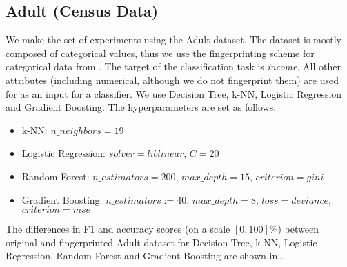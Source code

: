 \subsection{Adult (Census Data)}
We make the set of experiments using the Adult dataset. The dataset is mostly composed of categorical values, thus we use the fingerprinting scheme for categorical data from .
The target of the classification task is \textit{income}.
All other attributes (including numerical, although we do not fingerprint them) are used for as an input for a classifier.
We use Decision Tree, k-NN, Logistic Regression and Gradient Boosting. The hyperparameters are set as follows:
    \begin{itemize}
        \item k-NN: $n\_neighbors=19$
        \item Logistic Regression: $solver=liblinear$, $C=20$
        \item Random Forest: $n\_estimators=200$, $max\_depth=15$, $criterion=gini$
        \item Gradient Boosting: $n\_estimators:=40$, $max\_depth=8$, $loss=deviance$, $criterion=mse$
    \end{itemize}

The differences in F1 and accuracy scores (on a scale $[0,100]\%$) between original and fingerprinted Adult dataset for Decision Tree, k-NN, Logistic Regression, Random Forest and Gradient Boosting are shown in .

